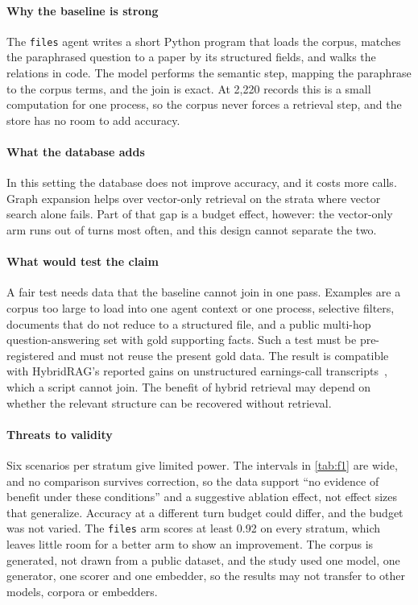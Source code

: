 \documentclass[preprint,12pt,a4paper]{elsarticle}
\newcommand{\code}[1]{\texttt{#1}}
\begin{document}
\paragraph{Why the baseline is strong} The \code{files} agent writes a short Python program that loads the corpus, matches the paraphrased question to a paper by its structured fields, and walks the relations in code. The model performs the semantic step, mapping the paraphrase to the corpus terms, and the join is exact. At 2,220 records this is a small computation for one process, so the corpus never forces a retrieval step, and the store has no room to add accuracy.

\paragraph{What the database adds} In this setting the database does not improve accuracy, and it costs more calls. Graph expansion helps over vector-only retrieval on the strata where vector search alone fails. Part of that gap is a budget effect, however: the vector-only arm runs out of turns most often, and this design cannot separate the two.

\paragraph{What would test the claim} A fair test needs data that the baseline cannot join in one pass. Examples are a corpus too large to load into one agent context or one process, selective filters, documents that do not reduce to a structured file, and a public multi-hop question-answering set with gold supporting facts. Such a test must be pre-registered and must not reuse the present gold data. The result is compatible with HybridRAG's reported gains on unstructured earnings-call transcripts~\cite{sarmah2024hybridrag}, which a script cannot join. The benefit of hybrid retrieval may depend on whether the relevant structure can be recovered without retrieval.

\paragraph{Threats to validity} Six scenarios per stratum give limited power. The intervals in \cref{tab:f1} are wide, and no comparison survives correction, so the data support ``no evidence of benefit under these conditions'' and a suggestive ablation effect, not effect sizes that generalize. Accuracy at a different turn budget could differ, and the budget was not varied. The \code{files} arm scores at least 0.92 on every stratum, which leaves little room for a better arm to show an improvement. The corpus is generated, not drawn from a public dataset, and the study used one model, one generator, one scorer and one embedder, so the results may not transfer to other models, corpora or embedders.
\end{document}
